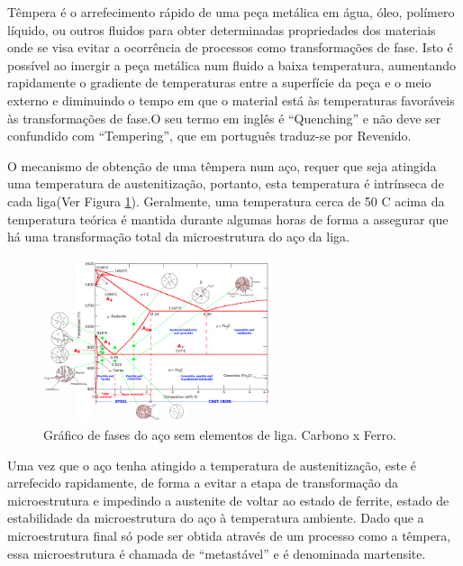Têmpera é o arrefecimento rápido de uma peça metálica em água, óleo, polímero líquido, ou outros fluidos para obter determinadas propriedades dos materiais onde se visa evitar a ocorrência de processos como transformações de fase. Isto é possível ao imergir a peça metálica num fluido a baixa temperatura, aumentando rapidamente o gradiente de temperaturas entre a superfície da peça e o meio externo e diminuindo o tempo em que o material está às temperaturas favoráveis às transformações de fase\cite{Chaus2006}.O seu termo em inglês é “Quenching” e não deve ser confundido com “Tempering”, que em português traduz-se por Revenido.
\par
O mecanismo de obtenção de uma têmpera num aço, requer que seja atingida uma temperatura de austenitização, portanto, esta temperatura é intrínseca de cada liga(Ver Figura \ref{fig:Iron_Carbon_Diagram}). Geralmente, uma temperatura cerca de 50 \textdegree C acima da temperatura teórica é mantida durante algumas horas de forma a assegurar que há uma transformação total da microestrutura do aço da liga.
\begin{figure}[htb]
    \centering
    \includegraphics[width = 0.6\textwidth]{Figures/Cap2/Iron_Carbon_Diagram.png}
    \caption[Gráfico de fases do aço. Carbono x Ferro]%
    {Gráfico de fases do aço sem elementos de liga. Carbono x Ferro\cite{FollSD}.}
    \label{fig:Iron_Carbon_Diagram}
\end{figure}
\par
Uma vez que o aço tenha atingido a temperatura de austenitização, este é arrefecido rapidamente, de forma a evitar a etapa de transformação da microestrutura e impedindo a austenite de voltar ao estado de ferrite, estado de estabilidade da microestrutura do aço à temperatura ambiente. Dado que a microestrutura final só pode ser obtida através de um processo como a têmpera, essa microestrutura é chamada de “metastável” e é denominada martensite.

